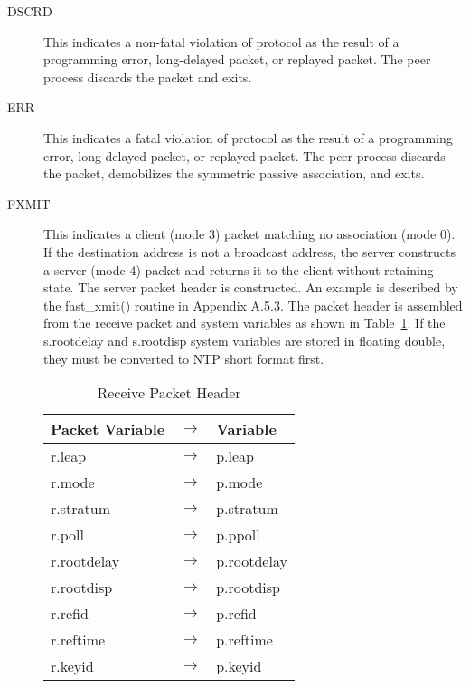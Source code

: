 \begin{description}

  \item[DSCRD] This indicates a non-fatal violation of protocol as the
    result of a programming error, long-delayed packet, or replayed
    packet. The peer process discards the packet and exits.

  \item[ERR] This indicates a fatal violation of protocol as the result of a
    programming error, long-delayed packet, or replayed packet. The peer
    process discards the packet, demobilizes the symmetric passive
    association, and exits.

  \item[FXMIT] This indicates a client (mode 3) packet matching no
    association (mode 0). If the destination address is not a broadcast
    address, the server constructs a server (mode 4) packet and returns
    it to the client without retaining state. The server packet header
    is constructed. An example is described by the fast\_xmit() routine
    in Appendix A.5.3. The packet header is assembled from the receive
    packet and system variables as shown in Table~\ref{receive_packet_header}. If the
    s.rootdelay and s.rootdisp system variables are stored in floating
    double, they must be converted to NTP short format first.

    \begin{table}[htb]
      \center
      \begin{tabular}{| l c l |}
        \hline
        Packet Variable & $ \rightarrow $ & Variable \\
        \hline
        \hline
        r.leap & $ \rightarrow $ & p.leap \\
        r.mode & $ \rightarrow $ & p.mode \\
        r.stratum & $ \rightarrow $ & p.stratum \\
        r.poll & $ \rightarrow $ & p.ppoll \\
        r.rootdelay & $ \rightarrow $ & p.rootdelay \\
        r.rootdisp & $ \rightarrow $ & p.rootdisp \\
        r.refid & $ \rightarrow $ & p.refid \\
        r.reftime & $ \rightarrow $ & p.reftime \\
        r.keyid & $ \rightarrow $ & p.keyid \\
        \hline
      \end{tabular}
      \caption{Receive Packet Header}
      \label{receive_packet_header}
    \end{table}


\end{description}
